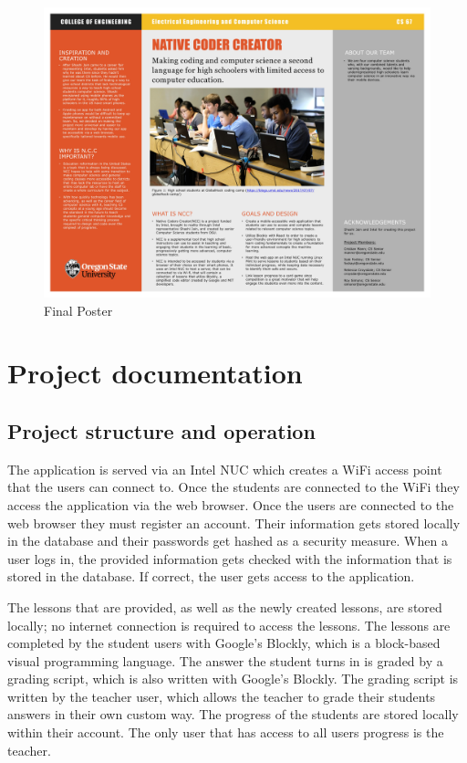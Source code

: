 \documentclass[draftclsnofoot,10pt,onecolumn]{IEEEtran}
\begin{document}
\begin{figure}[h]
            \centering
            \includegraphics[width=18cm]{capstone_poster.jpg}
            \caption{Final Poster}
            \label{fig:2}
        \end{figure}

\clearpage
\section{Project documentation}
\subsection{Project structure and operation}
The application is served via an Intel NUC which creates a WiFi access point that the users can connect to. Once the students are connected to the WiFi they access the application via the web browser. Once the users are connected to the web browser they must register an account. Their information gets stored locally in the database and their passwords get hashed as a security measure. When a user logs in, the provided information gets checked with the information that is stored in the database. If correct, the user gets access to the application. \newline

The lessons that are provided, as well as the newly created lessons, are stored locally; no internet connection is required to access the lessons. The lessons are completed by the student users with Google's Blockly, which is a block-based visual programming language. The answer the student turns in is graded by a grading script, which is also written with Google's Blockly. The grading script is written by the teacher user, which allows the teacher to grade their students answers in their own custom way. The progress of the students are stored locally within their account. The only user that has access to all users progress is the teacher.\newline
\end{document}
